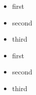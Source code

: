 \begin{itemize}
	\item first
	\item second
	\item third
\end{itemize}
\setlength{\parskip}{5cm}
\begin{itemize}
	\item first
	\item second
	\item third
\end{itemize}
